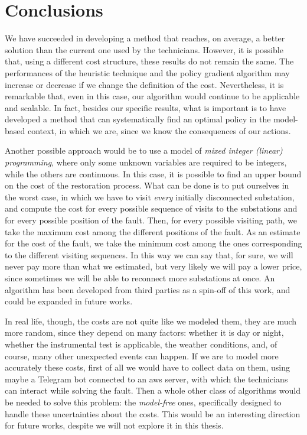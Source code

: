 \chapter{Conclusions}


We have succeeded in developing a method that reaches, on average, a better solution than the current one used by the technicians. However, it is possible that, using a different cost structure, these results do not remain the same. The performances of the heuristic technique and the policy gradient algorithm may increase or decrease if we change the definition of the cost. Nevertheless, it is remarkable that, even in this case, our algorithm would continue to be applicable and scalable. In fact, besides our specific results, what is important is to have developed a method that can systematically find an optimal policy in the model-based context, in which we are, since we know the consequences of our actions.

Another possible approach would be to use a model of \emph{mixed integer (linear) programming}, where only some unknown variables are required to be integers, while the others are continuous. In this case, it is possible to find an upper bound on the cost of the restoration process. What can be done is to put ourselves in the worst case, in which we have to visit \emph{every} initially disconnected substation, and compute the cost for every possible sequence of visits to the substations and for every possible position of the fault. Then, for every possible visiting path, we take the maximum cost among the different positions of the fault. As an estimate for the cost of the fault, we take the minimum cost among the ones corresponding to the different visiting sequences. In this way we can say that, for sure, we will never pay more than what we estimated, but very likely we will pay a lower price, since sometimes we will be able to reconnect more substations at once. An algorithm has been developed from third parties as a spin-off of this work, and could be expanded in future works.

In real life, though, the costs are not quite like we modeled them, they are much more random, since they depend on many factors: whether it is day or night, whether the instrumental test is applicable, the weather conditions, and, of course, many other unexpected events can happen. If we are to model more accurately these costs, first of all we would have to collect data on them, using maybe a Telegram bot connected to an \acrshort{aws} server, with which the technicians can interact while solving the fault. Then a whole other class of algorithms would be needed to solve this problem: the \emph{model-free} ones, specifically designed to handle these uncertainties about the costs. This would be an interesting direction for future works, despite we will not explore it in this thesis.